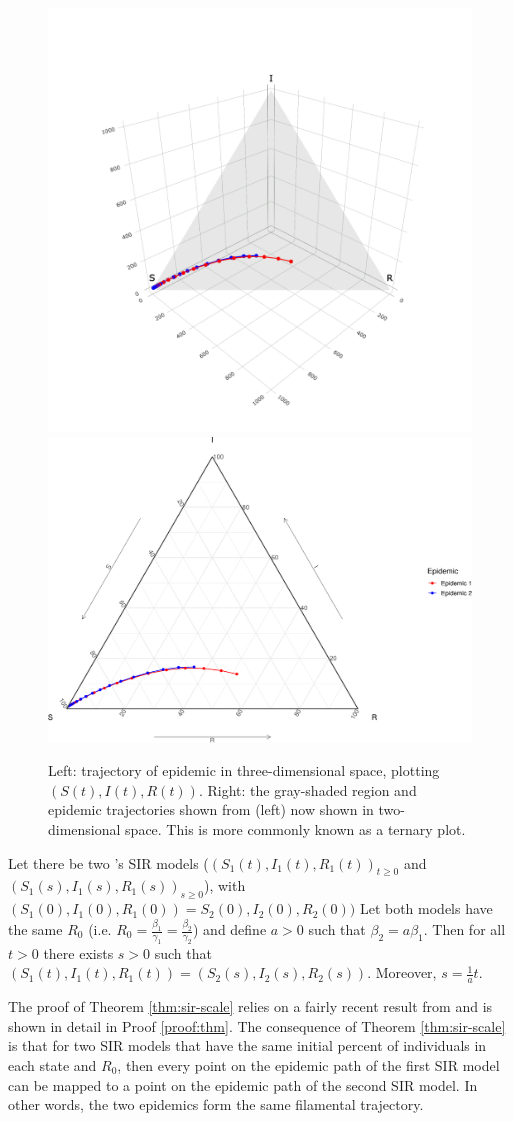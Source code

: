 \documentclass[
  shortnames]{jss}
\begin{document}
\begin{CodeChunk}
\begin{figure}[H]

{\centering \includegraphics[width=0.49\linewidth]{images/vis3d} \includegraphics[width=0.49\linewidth]{Figs/unnamed-chunk-3-2} 

}

\caption{\label{fig:different-scales-tern}Left: trajectory of epidemic in three-dimensional space, plotting $(S(t), I(t), R(t))$.  Right: the gray-shaded region and epidemic trajectories shown from (left) now shown in two-dimensional space.  This is more commonly known as a ternary plot.}\label{fig:unnamed-chunk-3}
\end{figure}
\end{CodeChunk}

\begin{theorem}\label{thm:sir-scale}
 Let there be two \citet{Kermack1927}'s SIR models ($(S_1(t),I_1(t),R_1(t))_{t\geq 0}$ and $(S_1(s),I_1(s),R_1(s))_{s\geq 0}$), with $(S_1(0),I_1(0),R_1(0))=S_2(0),I_2(0),R_2(0))$  Let both models have the same $R_0$ (i.e. $R_0 = \frac{\beta_1}{\gamma_1} = \frac{\beta_2}{\gamma_2}$) and define $a > 0$ such that $\beta_2 = a\beta_1$. Then for all $t > 0$ there exists $s>0$ such that $(S_1(t), I_1(t), R_1(t)) = (S_2(s), I_2(s), R_2(s))$.  Moreover, $s = \frac{1}{a}t$.
\end{theorem}

The proof of Theorem \ref{thm:sir-scale} relies on a fairly recent
result from \cite{Harko2014} and is shown in detail in Proof
\ref{proof:thm}. The consequence of Theorem \ref{thm:sir-scale} is that
for two SIR models that have the same initial percent of individuals in
each state and \(R_0\), then every point on the epidemic path of the
first SIR model can be mapped to a point on the epidemic path of the
second SIR model. In other words, the two epidemics form the same
filamental trajectory.
\end{document}

